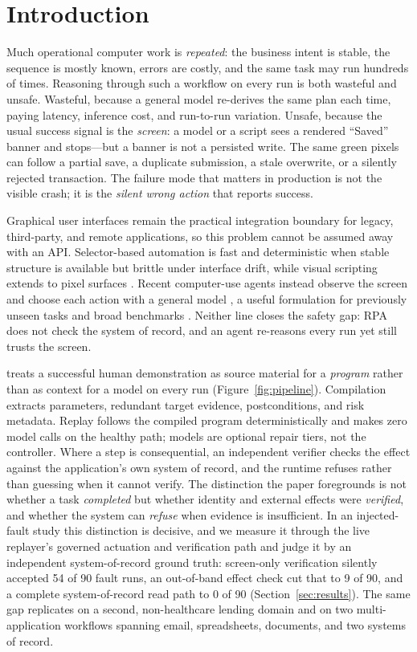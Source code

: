 \section{Introduction}

Much operational computer work is \emph{repeated}: the business intent is stable,
the sequence is mostly known, errors are costly, and the same task may run
hundreds of times. Reasoning through such a workflow on every run is both
wasteful and unsafe. Wasteful, because a general model re-derives the same plan
each time, paying latency, inference cost, and run-to-run variation. Unsafe,
because the usual success signal is the \emph{screen}: a model or a script sees a
rendered ``Saved'' banner and stops---but a banner is not a persisted write. The
same green pixels can follow a partial save, a duplicate submission, a stale
overwrite, or a silently rejected transaction. The failure mode that matters in
production is not the visible crash; it is the \emph{silent wrong action} that
reports success.

Graphical user interfaces remain the practical integration boundary for legacy,
third-party, and remote applications, so this problem cannot be assumed away with
an API. Selector-based automation is fast and deterministic when stable structure
is available but brittle under interface drift, while visual scripting extends to
pixel surfaces \cite{sikuli}. Recent computer-use agents instead observe the
screen and choose each action with a general model
\cite{anthropic2024computeruse,uitars2025,cheng2024seeclick}, a useful
formulation for previously unseen tasks and broad benchmarks
\cite{webarena,workarena,osworld}. Neither line closes the safety gap: RPA does
not check the system of record, and an agent re-reasons every run yet still trusts
the screen.

\system{} treats a successful human demonstration as source material for a
\emph{program} rather than as context for a model on every run
(Figure~\ref{fig:pipeline}). Compilation extracts parameters, redundant target
evidence, postconditions, and risk metadata. Replay follows the compiled program
deterministically and makes zero model calls on the healthy path; models are
optional repair tiers, not the controller. Where a step is consequential, an
independent verifier checks the effect against the application's own
system of record, and the runtime refuses rather than guessing when it cannot
verify. The distinction the paper foregrounds is not whether a task
\emph{completed} but whether identity and external effects were \emph{verified},
and whether the system can \emph{refuse} when evidence is insufficient. In an
injected-fault study this distinction is decisive, and we measure it through the
live replayer's governed actuation and verification path and judge it by an
independent system-of-record ground
truth: screen-only verification silently accepted 54 of 90 fault runs, an
out-of-band effect check cut that to 9 of 90, and a complete system-of-record
read path to 0 of 90 (Section~\ref{sec:results}). The same gap replicates on a
second, non-healthcare lending domain and on two multi-application workflows
spanning email, spreadsheets, documents, and two systems of record.

